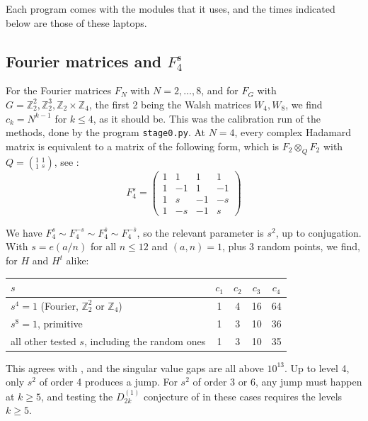 \documentclass[11pt]{amsart}
\begin{document}
\medskip

\noindent Each program comes with the modules that it uses, and the times indicated below are those of these laptops.

\subsection{Fourier matrices and $F_4^s$}

For the Fourier matrices $F_N$ with $N=2,\ldots,8$, and for $F_G$ with $G=\mathbb Z_2^2,\mathbb Z_2^3,\mathbb Z_2\times\mathbb Z_4$, the first 2 being the Walsh matrices $W_4,W_8$, we find $c_k=N^{k-1}$ for $k\leq4$, as it should be. This was the calibration run of the methods, done by the program \texttt{stage0.py}. At $N=4$, every complex Hadamard matrix is equivalent to a matrix of the following form, which is $F_2\otimes_QF_2$ with $Q=(^1_1{\ }^1_s)$, see \cite[Theorem 5.13]{banicaHM}:
$$F_4^s=\begin{pmatrix}1&1&1&1\\1&-1&1&-1\\1&s&-1&-s\\1&-s&-1&s\end{pmatrix}$$

\noindent We have $F_4^s\sim F_4^{-s}\sim F_4^{\bar{s}}\sim F_4^{-\bar{s}}$, so the relevant parameter is $s^2$, up to conjugation. With $s=e(a/n)$ for all $n\leq12$ and $(a,n)=1$, plus 3 random points, we find, for $H$ and $H^t$ alike:

\medskip

\begin{center}
\begin{tabular}{lcccc}
\toprule
$s$ & $c_1$ & $c_2$ & $c_3$ & $c_4$\\
\midrule
$s^4=1$ (Fourier, $\mathbb Z_2^2$ or $\mathbb Z_4$) & 1 & 4 & 16 & 64\\
$s^8=1$, primitive & 1 & 3 & 10 & 36\\
all other tested $s$, including the random ones & 1 & 3 & 10 & 35\\
\bottomrule
\end{tabular}
\end{center}

\medskip

\noindent This agrees with \cite{cn}, and the singular value gaps are all above $10^{13}$. Up to level 4, only $s^2$ of order 4 produces a jump. For $s^2$ of order 3 or 6, any jump must happen at $k\geq5$, and testing the $D_{2k}^{(1)}$ conjecture of \cite{cn} in these cases requires the levels $k\geq5$.
\end{document}

